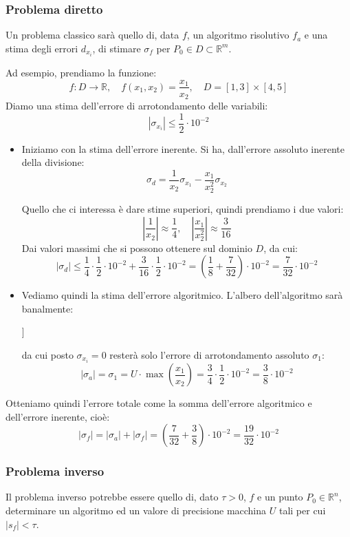 \documentclass[a4paper,11pt]{article}
\begin{document}
\subsubsection{Problema diretto}
Un problema classico sarà quello di, data $f$, un algoritmo risolutivo $f_a$ e una stima degli errori $d_{x_i}$, di stimare $\sigma_f$ per $P_0 \in D \subset \mathbb{R}^m$.

Ad esempio, prendiamo la funzione:
$$
f : D \rightarrow \mathbb{R}, \quad f(x_1, x_2) = \frac{x_1}{x_2}, \quad D = [1, 3] \times [4, 5]
$$
Diamo una stima dell'errore di arrotondamento delle variabili:
$$
|\sigma_{x_i}| \leq \frac{1}{2} \cdot 10^{-2}
$$

\begin{itemize}
	\item
Iniziamo con la stima dell'errore inerente.
Si ha, dall'errore assoluto inerente della divisione:
$$
\sigma_d = \frac{1}{x_2} \sigma_{x_1} - \frac{x_1}{x_2^2} \sigma_{x_2} 
$$

Quello che ci interessa è dare stime superiori, quindi prendiamo i due valori:
$$
\left| \frac{1}{x_2} \right| \approx \frac{1}{4}, \quad
\left| \frac{x_1}{x_2^2} \right| \approx \frac{3}{16}
$$
Dai valori massimi che si possono ottenere sul dominio $D$, da cui:
$$
|\sigma_d| \leq \frac{1}{4} \cdot \frac{1}{2} \cdot 10^{-2} + \frac{3}{16} \cdot \frac{1}{2} \cdot 10^{-2} = \left( \frac{1}{8} + \frac{7}{32} \right) \cdot 10^{-2} = \frac{7}{32} \cdot 10^{-2} 
$$

	\item
Vediamo quindi la stima dell'errore algoritmico.
L'albero dell'algoritmo sarà banalmente:
\begin{center}
	\begin{forest}
		[
			{$r_1 = \frac{x_1}{x_2}$}
			[{$x_1$}]
			[{$x_2$}]
		]	
	\end{forest}
\end{center}
da cui posto $\sigma_{x_i} = 0$ resterà solo l'errore di arrotondamento assoluto $\sigma_1$:
$$
|\sigma_a| = \sigma_1 = U \cdot \max\left( \frac{x_1}{x_2} \right) = \frac{3}{4} \cdot \frac{1}{2} \cdot 10^{-2} = \frac{3}{8} \cdot 10^{-2}
$$
\end{itemize}

Otteniamo quindi l'errore totale come la somma dell'errore algoritmico e dell'errore inerente, cioè:
$$
|\sigma_f| = |\sigma_a| + |\sigma_f| = \left( \frac{7}{32} + \frac{3}{8} \right) \cdot 10^{-2} = \frac{19}{32} \cdot 10^{-2}
$$

\subsubsection{Problema inverso}
Il problema inverso potrebbe essere quello di, dato $\tau > 0$, $f$ e un punto $P_0 \in \mathbb{R}^n$, determinare un algoritmo ed un valore di precisione macchina $U$ tali per cui $|s_f| < \tau$.
\end{document}
